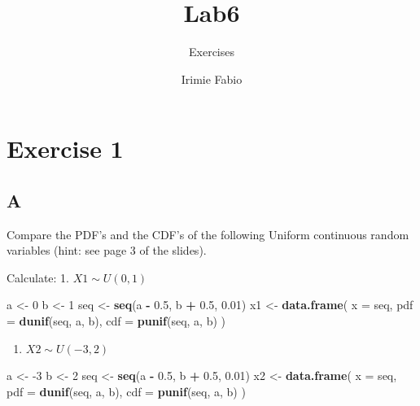 \documentclass[
]{article}
\title{Lab6}
\subtitle{Exercises}
\author{Irimie Fabio}
\date{}
\newenvironment{Shaded}{\begin{snugshade}}{\end{snugshade}}
\newcommand{\DataTypeTok}[1]{\textcolor[rgb]{0.13,0.29,0.53}{#1}}
\newcommand{\DecValTok}[1]{\textcolor[rgb]{0.00,0.00,0.81}{#1}}
\newcommand{\FloatTok}[1]{\textcolor[rgb]{0.00,0.00,0.81}{#1}}
\newcommand{\KeywordTok}[1]{\textcolor[rgb]{0.13,0.29,0.53}{\textbf{#1}}}
\newcommand{\NormalTok}[1]{#1}
\newcommand{\OperatorTok}[1]{\textcolor[rgb]{0.81,0.36,0.00}{\textbf{#1}}}
\newcommand{\StringTok}[1]{\textcolor[rgb]{0.31,0.60,0.02}{#1}}
\providecommand{\tightlist}{%
  \setlength{\itemsep}{0pt}\setlength{\parskip}{0pt}}
\begin{document}
\maketitle

{
\setcounter{tocdepth}{2}
\tableofcontents
}
\hypertarget{exercise-1}{%
\section{Exercise 1}\label{exercise-1}}

\hypertarget{a}{%
\subsection{A}\label{a}}

Compare the PDF's and the CDF's of the following Uniform continuous
random variables (hint: see page 3 of the slides).

Calculate: 1. \(X1 \sim U(0,1)\)

\begin{Shaded}
\begin{Highlighting}[]
\NormalTok{a \textless{}{-}}\StringTok{ }\DecValTok{0}
\NormalTok{b \textless{}{-}}\StringTok{ }\DecValTok{1}
\NormalTok{seq \textless{}{-}}\StringTok{ }\KeywordTok{seq}\NormalTok{(a }\OperatorTok{{-}}\StringTok{ }\FloatTok{0.5}\NormalTok{, b }\OperatorTok{+}\StringTok{ }\FloatTok{0.5}\NormalTok{, }\FloatTok{0.01}\NormalTok{)}
\NormalTok{x1 \textless{}{-}}\StringTok{ }\KeywordTok{data.frame}\NormalTok{(}
  \DataTypeTok{x =}\NormalTok{ seq,}
  \DataTypeTok{pdf =} \KeywordTok{dunif}\NormalTok{(seq, a, b),}
  \DataTypeTok{cdf =} \KeywordTok{punif}\NormalTok{(seq, a, b)}
\NormalTok{)}
\end{Highlighting}
\end{Shaded}

\begin{enumerate}
\def\labelenumi{\arabic{enumi}.}
\setcounter{enumi}{1}
\tightlist
\item
  \(X2 \sim U(-3,2)\)
\end{enumerate}

\begin{Shaded}
\begin{Highlighting}[]
\NormalTok{a \textless{}{-}}\StringTok{ }\DecValTok{{-}3}
\NormalTok{b \textless{}{-}}\StringTok{ }\DecValTok{2}
\NormalTok{seq \textless{}{-}}\StringTok{ }\KeywordTok{seq}\NormalTok{(a }\OperatorTok{{-}}\StringTok{ }\FloatTok{0.5}\NormalTok{, b }\OperatorTok{+}\StringTok{ }\FloatTok{0.5}\NormalTok{, }\FloatTok{0.01}\NormalTok{)}
\NormalTok{x2 \textless{}{-}}\StringTok{ }\KeywordTok{data.frame}\NormalTok{(}
  \DataTypeTok{x =}\NormalTok{ seq,}
  \DataTypeTok{pdf =} \KeywordTok{dunif}\NormalTok{(seq, a, b),}
  \DataTypeTok{cdf =} \KeywordTok{punif}\NormalTok{(seq, a, b)}
\NormalTok{)}
\end{Highlighting}
\end{Shaded}
\end{document}
